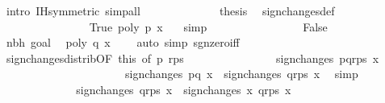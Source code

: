 \begin{isabellebody}
\ {\isacharparenleft}intro\ IH{\isacharparenleft}{}{\isacharparenright}{\isacharbrackleft}symmetric{\isacharbrackright}{\isacharcomma}\ simp{\isacharunderscore}all{\isacharparenright}\isanewline
\ \ \ \ \ \ \ \ \ \ \isamarkupfalse%
\ \isamarkupfalse%
\ {\isacharquery}thesis\ \isamarkupfalse%
\ sign{\isacharunderscore}changes{\isacharprime}{\isacharunderscore}def\ \isanewline
\ \ \ \ \ \ \ \ \ \ \ \ \ \ \isamarkupfalse%
\ True\ {\isacharbackquoteopen}poly\ p\ x\ {\isasymnoteq}\ {}{\isacharbackquoteclose}\isamarkupfalse%
\ simp\isanewline
\ \ \ \ \ \ \isamarkupfalse%
\isanewline
\ \ \ \ \ \ \ \ \isamarkupfalse%
\ False\isanewline
\ \ \ \ \ \ \ \ \ \ \isamarkupfalse%
\ nbh\ goal{}{\isacharparenleft}{}{\isacharparenright}\ \isamarkupfalse%
\ {\isachardoublequoteopen}poly\ q\ x\ {\isasymnoteq}\ {}{\isachardoublequoteclose}\ \isamarkupfalse%
\ {\isacharparenleft}auto\ simp{\isacharcolon}\ sgn{\isacharunderscore}zero{\isacharunderscore}iff{\isacharparenright}\isanewline
\ \ \ \ \ \ \ \ \ \ \isamarkupfalse%
\ sign{\isacharunderscore}changes{\isacharunderscore}distrib{\isacharbrackleft}OF\ this{\isacharcomma}\ of\ {\isachardoublequoteopen}{\isacharbrackleft}p{\isacharbrackright}{\isachardoublequoteclose}\ {\isachardoublequoteopen}r{\isacharhash}ps{\isachardoublequoteclose}{\isacharbrackright}\isanewline
\ \ \ \ \ \ \ \ \ \ \ \ \ \ \isamarkupfalse%
\ {\isachardoublequoteopen}sign{\isacharunderscore}changes\ {\isacharparenleft}p{\isacharhash}q{\isacharhash}r{\isacharhash}ps{\isacharparenright}\ x\ {\isacharequal}\ \isanewline
\ \ \ \ \ \ \ \ \ \ \ \ \ \ \ \ \ \ \ \ \ \ sign{\isacharunderscore}changes\ {\isacharparenleft}{\isacharbrackleft}p{\isacharcomma}q{\isacharbrackright}{\isacharparenright}\ x\ {\isacharplus}\ sign{\isacharunderscore}changes\ {\isacharparenleft}q{\isacharhash}r{\isacharhash}ps{\isacharparenright}\ x{\isachardoublequoteclose}\ \isamarkupfalse%
\ simp\isanewline
\ \ \ \ \ \ \ \ \ \ \isamarkupfalse%
\ \isamarkupfalse%
\ {\isachardoublequoteopen}sign{\isacharunderscore}changes\ {\isacharparenleft}q{\isacharhash}r{\isacharhash}ps{\isacharparenright}\ x\ {\isacharequal}\ sign{\isacharunderscore}changes{\isacharprime}\ x\ {\isacharparenleft}q{\isacharhash}r{\isacharhash}ps{\isacharparenright}\ x{\isachardoublequoteclose}\isanewline

\end{isabellebody}
